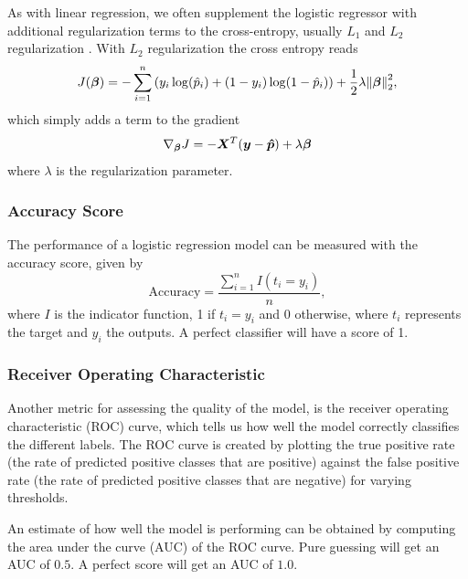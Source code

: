 As with linear regression, we often supplement the logistic regressor with additional regularization terms to the cross-entropy, usually $L_1$ and $L_2$ regularization \cite{logreglec}. With $L_2$ regularization the cross entropy reads
\begin{equation}\label{eq:cross-ent with L2 reg}
    J (\bm{\beta}) = - \sum_{i=1}^n \qty(y_i \log(\hat{p}_i) + (1-y_i) \log(1 - \hat{p}_i) ) + \frac{1}{2} \lambda \norm{\bm{\beta}}_2^2,
\end{equation}
which simply adds a term to the gradient
\begin{equation}\label{eq:logcost deriv L2 reg}
    \nabla_{\bm{\beta}} J = -\bm{X}^T \qty(\bm{y} -\bm{\hat{p}}) + \lambda \bm{\beta}
\end{equation}
where $\lambda$ is the regularization parameter. 


\subsubsection{Accuracy Score}

The performance of a logistic regression model can be measured with the accuracy score, given by
\begin{equation}\label{eq:accuracy score}
    \text{Accuracy} = \frac{\sum_{i=1}^n I(t_i = y_i)}{n},
\end{equation}
where $I$ is the indicator function, 1 if $t_i = y_i$ and 0 otherwise, where $t_i$ represents the target and $y_i$ the outputs. A perfect classifier will have a score of 1.

\subsubsection{Receiver Operating Characteristic} 
Another metric for assessing the quality of the model, is the receiver operating characteristic (ROC) curve, which tells us how well the model correctly classifies the different labels. The ROC curve is created by plotting the true positive rate (the rate of predicted positive classes that are positive) against the false positive rate (the rate of predicted positive classes that are negative) for varying thresholds. 

An estimate of how well the model is performing can be obtained by computing the area under the curve (AUC) of the ROC curve. Pure guessing will get an AUC of $0.5$. A perfect score will get an AUC of $1.0$. \cite{logregMorten}


